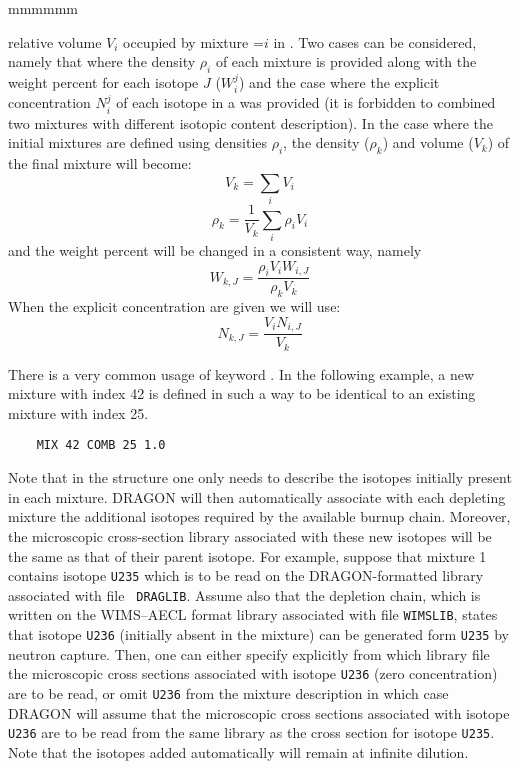 \begin{ListeDeDescription}{mmmmmm}
\item[\dusa{relvol}] relative volume $V_{i}$ occupied by mixture
=$i$ in .  Two cases can be considered, namely that
where the density $\rho_{i}$ of each mixture  is provided along with
the weight percent for each isotope $J$ ($W_{i}^{j}$) and the case where the
explicit concentration $N_{i}^{j}$ of each isotope in a  was provided
(it is forbidden to combined two mixtures with different isotopic content
description). In the case where the initial mixtures are defined using densities
$\rho_{i}$, the density ($\rho_k$) and volume ($V_{k}$) of the final mixture
will become:
  $$V_{k}=\sum_{i} V_{i} $$
  $$\rho_{k}=\frac{1}{V_{k}} \sum_{i}\rho_{i}V_{i}$$
and the weight percent will be changed in a consistent way, namely
  $$W_{k,J}=\frac{\rho_{i}V_{i}W_{i,J}}{\rho_{k} V_{k} } $$
When the explicit concentration are given we will use:
  $$N_{k,J}=\frac{V_{i}N_{i,J}}{V_{k} } $$

\vskip 0.08cm

There is a very common usage of keyword . In the following example, a new mixture with index 42
is defined in such a way to be identical to an existing mixture with index 25. 
\begin{verbatim}
    MIX 42 COMB 25 1.0
\end{verbatim}

\end{ListeDeDescription}

Note that in the structure  one only needs to describe the
isotopes initially present in each mixture. DRAGON will then automatically
associate with each depleting mixture the additional isotopes required by the
available burnup chain. Moreover, the microscopic cross-section library
associated with these new isotopes will be the same as that of their parent
isotope. For example, suppose that mixture 1 contains isotope {\tt U235} which
is to be read on the DRAGON-formatted library associated with file {\tt
DRAGLIB}. Assume also that the depletion chain, which is written on the 
WIMS--AECL format library associated with file {\tt WIMSLIB}, states that isotope
{\tt U236} (initially absent in the mixture) can be generated form {\tt U235} by
neutron capture. Then, one can either specify explicitly from which library file
the microscopic cross sections associated with isotope {\tt U236} (zero
concentration) are to be read, or omit {\tt U236} from the mixture description
in which case DRAGON will assume that the microscopic cross sections associated
with isotope {\tt U236} are to be read from the same library as the cross
section for isotope {\tt U235}. Note that the isotopes added automatically will
remain at infinite dilution.


